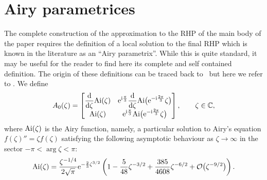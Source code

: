 \documentclass[10pt,a4paper]{amsart}
\numberwithin{equation}{section}
\theoremstyle{definition}
\def \d{{\mathrm d}}
\begin{document}
\section{Airy parametrices}\label{app1}
The complete construction of the approximation to the RHP of the main body of the paper requires the definition of a local solution to the final RHP which is known in the literature as an ``Airy parametrix''. While this is quite standard, it may be useful for the reader to find here its complete and self contained definition. The origin of these definitions can be traced back to~\cite{DKMVZ} but here we refer to \cite[Appendix~A]{BertolaBothner}.
We define\vspace{-1mm}
\[%
	A_0(\zeta) = \begin{bmatrix}
	\displaystyle\frac{\d}{\d\zeta}\textnormal{Ai}(\zeta) &\displaystyle {\rm e}^{{\rm i}\frac{\pi}{3}}\frac{\d}{\d\zeta}\textnormal{Ai}\bigl({\rm e}^{-{\rm i}\frac{2\pi}{3}}\zeta\bigr) \\
	\textnormal{Ai}(\zeta) & \displaystyle {\rm e}^{{\rm i}\frac{\pi}{3}}\textnormal{Ai}\bigl({\rm e}^{-{\rm i}\frac{2\pi}{3}}\zeta\bigr)\\
	\end{bmatrix},\qquad\zeta\in\mathbb{C},\vspace{-1mm}
\]
where $\textnormal{Ai}(\zeta)$ is the Airy function, namely, a particular solution to Airy's equation
$f(\zeta)''=\zeta f(\zeta)$
satisfying the following asymptotic behaviour as $\zeta\rightarrow\infty$ in the sector $-\pi<\operatorname{arg} \zeta<\pi$:\vspace{-1mm}
\begin{equation*}
	\textnormal{Ai}(\zeta) = \frac{\zeta^{-1/4}}{2\sqrt{\pi}}{\rm e}^{-\frac{2}{3}\zeta^{3/2}}\left(1-\frac{5}{48}\zeta^{-3/2}+\frac{385}{4608}\zeta^{-6/2}+\mathcal O\bigl(\zeta^{-9/2}\bigr)\right).\vspace{-1mm}
\end{equation*}
\end{document}

